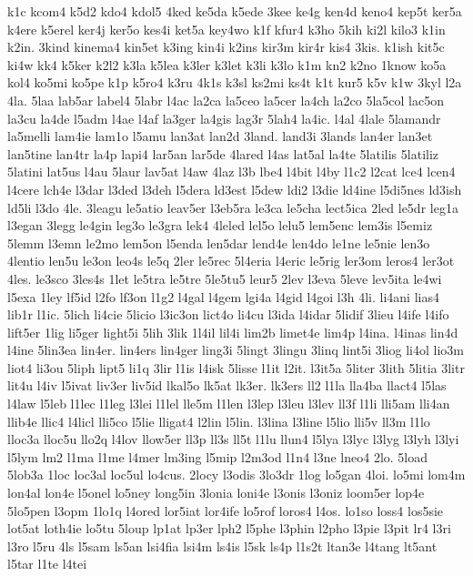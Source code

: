 {k1c
kcom4
k5d2
kdo4
kdol5
4ked
ke5da
k5ede
3kee
ke4g
ken4d
keno4
kep5t
ker5a
k4ere
k5erel
ker4j
ker5o
kes4i
ket5a
key4wo
k1f
kfur4
k3ho
5kih
ki2l
kilo3
k1in
k2in.
3kind
kinema4
kin5et
k3ing
kin4i
k2ins
kir3m
kir4r
kis4
3kis.
k1ish
kit5c
ki4w
kk4
k5ker
k2l2
k3la
k5lea
k3ler
k3let
k3li
k3lo
k1m
kn2
k2no
1know
ko5a
kol4
ko5mi
ko5pe
k1p
k5ro4
k3ru
4k1s
k3sl
ks2mi
ks4t
k1t
kur5
k5v
k1w
3kyl
l2a
4la.
5laa
lab5ar
label4
5labr
l4ac
la2ca
la5ceo
la5cer
la4ch
la2co
5la5col
lac5on
la3cu
la4de
l5adm
l4ae
l4af
la3ger
la4gis
lag3r
5lah4
la4ic.
l4al
4lale
5lamandr
la5melli
lam4ie
lam1o
l5amu
lan3at
lan2d
3land.
land3i
3lands
lan4er
lan3et
lan5tine
lan4tr
la4p
lapi4
lar5an
lar5de
4lared
l4as
lat5al
la4te
5latilis
5latiliz
5latini
lat5us
l4au
5laur
lav5at
l4aw
4laz
l3b
lbe4
l4bit
l4by
l1c2
l2cat
lce4
lcen4
l4cere
lch4e
l3dar
l3ded
l3deh
l5dera
ld3est
l5dew
ldi2
l3die
ld4ine
l5di5nes
ld3ish
ld5li
l3do
4le.
3leagu
le5atio
leav5er
l3eb5ra
le3ca
le5cha
lect5ica
2led
le5dr
leg1a
l3egan
3legg
le4gin
leg3o
le3gra
lek4
4leled
lel5o
lelu5
lem5enc
lem3is
l5emiz
5lemm
l3emn
le2mo
lem5on
l5enda
len5dar
lend4e
len4do
le1ne
le5nie
len3o
4lentio
len5u
le3on
leo4s
le5q
2ler
le5rec
5l4eria
l4eric
le5rig
ler3om
leros4
ler3ot
4les.
le3sco
3les4s
1let
le5tra
le5tre
5le5tu5
leur5
2lev
l3eva
5leve
lev5ita
le4wi
l5exa
1ley
lf5id
l2fo
lf3on
l1g2
l4gal
l4gem
lgi4a
l4gid
l4goi
l3h
4li.
li4ani
lias4
lib1r
l1ic.
5lich
li4cie
5licio
l3ic3on
lict4o
li4cu
l3ida
l4idar
5lidif
3lieu
l4ife
l4ifo
lift5er
1lig
li5ger
light5i
5lih
3lik
1l4il
lil4i
lim2b
limet4e
lim4p
l4ina.
l4inas
lin4d
l4ine
5lin3ea
lin4er.
lin4ers
lin4ger
ling3i
5lingt
3lingu
3linq
lint5i
3liog
li4ol
lio3m
liot4
li3ou
5liph
lipt5
li1q
3lir
l1is
l4isk
5lisse
l1it
l2it.
l3it5a
5liter
3lith
5litia
3litr
lit4u
l4iv
l5ivat
liv3er
liv5id
lkal5o
lk5at
lk3er.
lk3ers
ll2
l1la
lla4ba
llact4
l5las
l4law
l5leb
l1lec
l1leg
l3lei
l1lel
lle5m
l1len
l3lep
l3leu
l3lev
ll3f
l1li
lli5am
lli4an
llib4e
llic4
l4licl
lli5co
l5lie
lligat4
l2lin
l5lin.
l3lina
l3line
l5lio
lli5v
ll3m
l1lo
lloc3a
lloc5u
llo2q
l4lov
llow5er
ll3p
ll3s
ll5t
l1lu
llun4
l5lya
l3lyc
l3lyg
l3lyh
l3lyi
l5lym
lm2
l1ma
l1me
l4mer
lm3ing
l5mip
l2m3od
l1n4
l3ne
lneo4
2lo.
5load
5lob3a
1loc
loc3al
loc5ul
lo4cus.
2locy
l3odis
3lo3dr
1log
lo5gan
4loi.
lo5mi
lom4m
lon4al
lon4e
l5onel
lo5ney
long5in
3lonia
loni4e
l3onis
l3oniz
loom5er
lop4e
5lo5pen
l3opm
1lo1q
l4ored
lor5iat
lor4ife
lo5rof
loros4
l4os.
lo1so
loss4
los5sie
lot5at
loth4ie
lo5tu
5loup
lp1at
lp3er
lph2
l5phe
l3phin
l2pho
l3pie
l3pit
lr4
l3ri
l3ro
l5ru
4ls
l5sam
ls5an
lsi4fia
lsi4m
ls4is
l5sk
ls4p
l1s2t
ltan3e
l4tang
lt5ant
l5tar
l1te
l4tei
}
